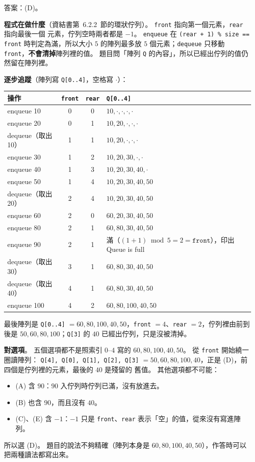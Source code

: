 \begin{pastsoln}
答案：(D)。

\textbf{程式在做什麼}（資結書第~6.2.2~節的環狀佇列）。 \texttt{front} 指向第一個元素，\texttt{rear} 指向最後一個
元素，佇列空時兩者都是 $-1$。 \texttt{enqueue} 在 \texttt{(rear + 1) \% size == front} 時判定為滿，所以大小 $5$
的陣列最多放 $5$ 個元素；\texttt{dequeue} 只移動 \texttt{front}，\textbf{不會清掉}陣列裡的值。 題目問「陣列
\texttt{Q} 的內容」，所以已經出佇列的值仍然留在陣列裡。

\textbf{逐步追蹤}（陣列寫 \texttt{Q[0..4]}，空格寫 $\cdot$）：
\begin{center}
\small
\begin{tabular}{lccl}
\toprule
操作 & \texttt{front} & \texttt{rear} & \texttt{Q[0..4]} \\
\midrule
enqueue 10 & 0 & 0 & $10, \cdot, \cdot, \cdot, \cdot$ \\
enqueue 20 & 0 & 1 & $10, 20, \cdot, \cdot, \cdot$ \\
dequeue（取出 10） & 1 & 1 & $10, 20, \cdot, \cdot, \cdot$ \\
enqueue 30 & 1 & 2 & $10, 20, 30, \cdot, \cdot$ \\
enqueue 40 & 1 & 3 & $10, 20, 30, 40, \cdot$ \\
enqueue 50 & 1 & 4 & $10, 20, 30, 40, 50$ \\
dequeue（取出 20） & 2 & 4 & $10, 20, 30, 40, 50$ \\
enqueue 60 & 2 & 0 & $60, 20, 30, 40, 50$ \\
enqueue 80 & 2 & 1 & $60, 80, 30, 40, 50$ \\
enqueue 90 & 2 & 1 & 滿（$(1 + 1) \bmod 5 = 2 = \texttt{front}$），印出 Queue is full \\
dequeue（取出 30） & 3 & 1 & $60, 80, 30, 40, 50$ \\
dequeue（取出 40） & 4 & 1 & $60, 80, 30, 40, 50$ \\
enqueue 100 & 4 & 2 & $60, 80, 100, 40, 50$ \\
\bottomrule
\end{tabular}
\end{center}
最後陣列是 \texttt{Q[0..4]} $= 60, 80, 100, 40, 50$，\texttt{front} $= 4$、\texttt{rear} $= 2$，佇列裡由前到後是
$50, 60, 80, 100$；\texttt{Q[3]} 的 $40$ 已經出佇列，只是沒被清掉。

\textbf{對選項}。 五個選項都不是照索引 $0$--$4$ 寫的 $60, 80, 100, 40, 50$。 從 \texttt{front} 開始繞一圈讀陣列：
\texttt{Q[4], Q[0], Q[1], Q[2], Q[3]} $= 50, 60, 80, 100, 40$，正是 (D)，前四個是佇列裡的元素，最後的 $40$ 是殘留的
舊值。 其他選項都不可能：
\begin{itemize}
\item (A) 含 $90$：$90$ 入佇列時佇列已滿，沒有放進去。
\item (B) 也含 $90$，而且沒有 $40$。
\item (C)、(E) 含 $-1$：$-1$ 只是 \texttt{front}、\texttt{rear} 表示「空」的值，從來沒有寫進陣列。
\end{itemize}
所以選 (D)。 題目的說法不夠精確（陣列本身是 $60, 80, 100, 40, 50$），作答時可以把兩種讀法都寫出來。
\end{pastsoln}
